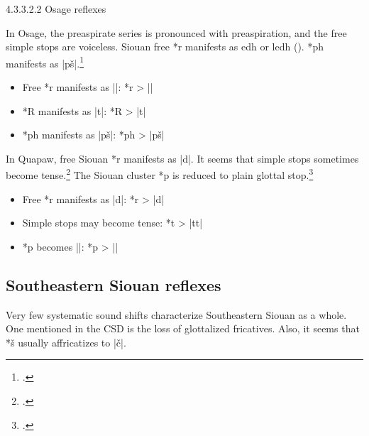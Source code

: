 \documentclass[output=paper]{LSP/langsci}
\begin{document}
4.3.3.2.2  Osage reflexes
\vspace{1em}

In Osage, the preaspirate series is pronounced with preaspiration, and the free simple stops are voiceless.  Siouan free *r manifests as edh or ledh ().  *ph manifests as |pš|.\footnote{ \citealt[64]{CSD2006}.} 

\begin{itemize}
\item Free *r manifests as ||: \hspace{1em} *r	>	||
\item *R manifests as |t|: \hspace{3em} *R	>	|t|
\item *ph manifests as |pš|: \hspace{2em} *ph	>	|pš|
\end{itemize}


In Quapaw, free Siouan *r manifests as |d|.  It seems that simple stops sometimes become tense.\footnote{\citealt[833]{CSD2006}.} The Siouan cluster *p\textsuperscript{} is reduced to plain glottal stop.\footnote{\citealt[831]{CSD2006}.} 

\begin{itemize}
\item Free *r manifests as |d|: \hspace{5em} *r	>	|d|
\item Simple stops may become tense:	\hspace{1em} *t	>	|tt|
\item *p\textsuperscript{} becomes |\textsuperscript{}|: \hspace{8em} *p\textsuperscript{}	>	|\textsuperscript{}|
\end{itemize}

\subsection{Southeastern Siouan reflexes}

Very few systematic sound shifts characterize Southeastern Siouan as a whole.  One mentioned in the CSD is the loss of glottalized fricatives.  Also, it seems that *š usually affricatizes to |\v{c}|.
\end{document}
